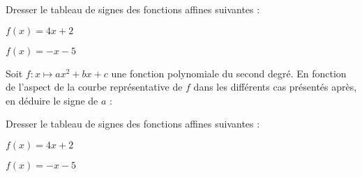 \documentclass{exos}
\begin{document}
\begin{exercize*}
Dresser le tableau de signes des fonctions affines suivantes :
\begin{alphaquestions}
\item $f(x) = 4x + 2$
\item $f(x) = -x - 5$
\end{alphaquestions}
\end{exercize*}
\begin{exercize*}
Soit $f \colon x \mapsto ax^2 + bx + c$ une fonction polynomiale du second degré. En fonction de l'aspect de la courbe représentative de $f$ dans les différents cas présentés après, en déduire le signe de $a$ :
\begin{alphaquestions}
\begin{minipage}{0.45\textwidth}
\item \hfill

\end{minipage}
\hfill
\begin{minipage}{0.45\textwidth}
\item \hfill

\end{minipage}
\end{alphaquestions}
\end{exercize*}
\vspace*{2cm}
\begin{exercize*}
Dresser le tableau de signes des fonctions affines suivantes :
\begin{alphaquestions}
\item $f(x) = 4x + 2$
\item $f(x) = -x - 5$
\end{alphaquestions}
\end{exercize*}
\end{document}
